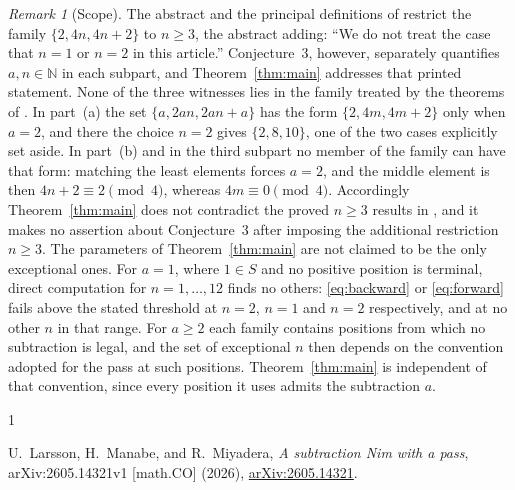 \documentclass[11pt]{amsart}
\theoremstyle{remark}
\newtheorem{remark}[theorem]{Remark}
\begin{document}
\begin{remark}[Scope]
The abstract and the principal definitions of \cite{LMM} restrict the
family $\{2,4n,4n+2\}$ to $n\geq3$, the abstract adding: ``We do not
treat the case that $n=1$ or $n=2$ in this article.'' Conjecture~3,
however, separately quantifies $a,n\in\mathbb N$ in each subpart, and
Theorem~\ref{thm:main} addresses that printed statement. None of the
three witnesses lies in the family treated by the theorems of
\cite{LMM}. In part~(a) the set $\{a,2an,2an+a\}$ has the form
$\{2,4m,4m+2\}$ only when $a=2$, and there the choice $n=2$ gives
$\{2,8,10\}$, one of the two cases explicitly set aside. In part~(b)
and in the third subpart no member of the family can have that form:
matching the least elements forces $a=2$, and the middle element is
then $4n+2\equiv2\pmod4$, whereas $4m\equiv0\pmod4$. Accordingly
Theorem~\ref{thm:main} does not contradict the proved $n\geq3$ results
in \cite{LMM}, and it
makes no assertion about Conjecture~3 after imposing the additional
restriction $n\geq3$. The parameters of Theorem~\ref{thm:main} are not
claimed to be the only exceptional ones. For $a=1$, where $1\in S$ and
no positive position is terminal, direct computation for
$n=1,\dots,12$ finds no others: \eqref{eq:backward} or
\eqref{eq:forward} fails above the stated threshold at $n=2$, $n=1$
and $n=2$ respectively, and at no other $n$ in that range. For
$a\geq2$ each family contains positions from which no subtraction is
legal, and the set of exceptional $n$ then depends on the convention
adopted for the pass at such positions. Theorem~\ref{thm:main} is
independent of that convention, since every position it uses admits
the subtraction $a$.
\end{remark}

\begin{thebibliography}{1}

U.~Larsson, H.~Manabe, and R.~Miyadera,
\emph{A subtraction Nim with a pass},
arXiv:2605.14321v1 [math.CO] (2026),
\href{https://arxiv.org/abs/2605.14321}{arXiv:2605.14321}.

\end{thebibliography}
\end{document}
